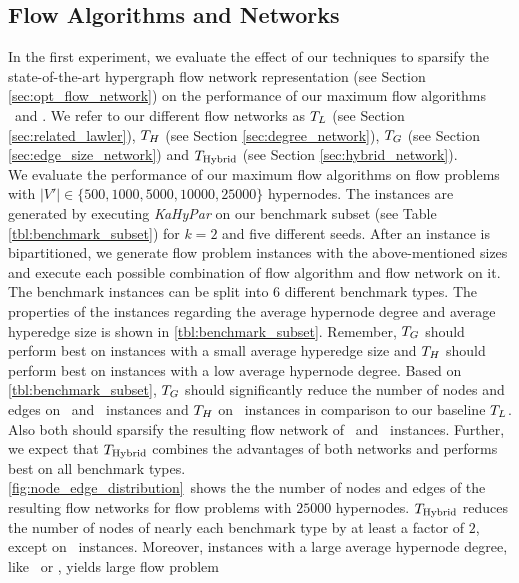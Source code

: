 \subsection{Flow Algorithms and Networks}
\label{sec:exp_flow_network}

In the first experiment, we evaluate the effect of our techniques to sparsify
the state-of-the-art hypergraph flow network representation (see Section \ref{sec:opt_flow_network})
on the performance of our maximum flow algorithms \GoldbergTarjan~and \EdmondKarp. 
We refer to our different flow networks as $T_L$ (see Section \ref{sec:related_lawler}), $T_H$ (see Section 
\ref{sec:degree_network}), $T_G$ (see Section \ref{sec:edge_size_network})
and $T_{\text{Hybrid}}$ (see Section \ref{sec:hybrid_network}). \\
We evaluate the performance of our maximum flow algorithms on flow problems with
$|V'| \in \{500,1000,5000,10000,25000\}$ hypernodes. The instances are generated by executing
\emph{KaHyPar} on our benchmark subset (see Table \ref{tbl:benchmark_subset}) for $k = 2$ and five different 
seeds. After an instance is bipartitioned, we generate flow problem instances
with the above-mentioned sizes and execute each possible combination of flow algorithm and
flow network on it. \\
The benchmark instances can be split into $6$ different benchmark types. The properties of the instances
regarding the average hypernode degree and average hyperedge size is shown in \autoref{tbl:benchmark_subset}.
Remember, $T_G$ should perform best on instances with a small average hyperedge size and
$T_H$ should perform best on instances with a low average hypernode degree. Based on 
\autoref{tbl:benchmark_subset}, $T_G$ should significantly reduce the number of
nodes and edges on \Primal~and \Literal~instances and $T_H$ on \Dual~instances in
comparison to our baseline $T_L$. Also both should sparsify the resulting flow network
of \ISPD~and \DAC~instances. Further, we expect that $T_{\text{Hybrid}}$ combines the advantages of
both networks and performs best on all benchmark types.\\
\autoref{fig:node_edge_distribution}~shows the the number of nodes and edges
of the resulting flow networks for flow problems with $25000$ hypernodes.
$T_{\text{Hybrid}}$ reduces the number of nodes of nearly each benchmark type 
by at least a factor of $2$, except on \SPM~instances. Moreover, instances 
with a large average hypernode degree, like \Primal~or \Literal, yields large flow problem 

